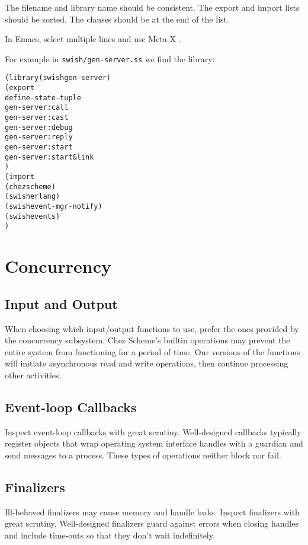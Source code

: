 \documentclass[letterpaper,11pt,twoside,final]{article}
\begin{document}
The filename and library name should be consistent. The export and
import lists should be sorted. The  clauses should be
at the end of the  list.

In Emacs, select multiple lines and use Meta-X .

For example in \texttt{swish/gen-server.ss} we find the
 library: \antipar
\begin{alltt}
(library (swish gen-server)
  (export
   define-state-tuple
   gen-server:call
   gen-server:cast
   gen-server:debug
   gen-server:reply
   gen-server:start
   gen-server:start&link
   )
  (import
   (chezscheme)
   (swish erlang)
   (swish event-mgr-notify)
   (swish events)
   )
\end{alltt}

\section* {Concurrency}

\subsection* {Input and Output}

When choosing which input/output functions to use, prefer the ones
provided by the concurrency subsystem. Chez Scheme's builtin
operations may prevent the entire system from functioning for a period
of time. Our versions of the functions will initiate asynchronous read
and write operations, then continue processing other activities.

\subsection* {Event-loop Callbacks}

Inspect event-loop callbacks with great scrutiny. Well-designed
callbacks typically register objects that wrap operating system
interface handles with a guardian and send messages to a
process. These types of operations neither block nor fail.

\subsection* {Finalizers}

Ill-behaved finalizers may cause memory and handle leaks. Inspect
finalizers with great scrutiny. Well-designed finalizers guard against
errors when closing handles and include time-outs so that they don't
wait indefinitely.
\end{document}
